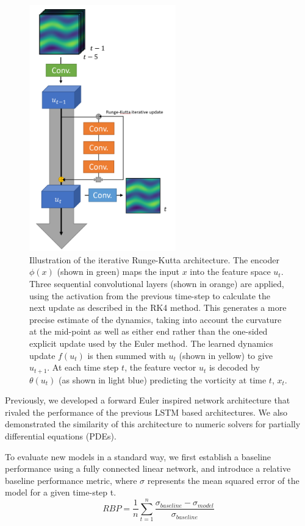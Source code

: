 \documentclass[12pt]{article}
\theoremstyle{plain}
\theoremstyle{remark}
\theoremstyle{definition}
\begin{document}
\begin{figure}

	\centering
	\includegraphics[width=2.5in]{pde_arch_rk4}
	\caption{Illustration of the iterative Runge-Kutta architecture. The encoder $\phi(x)$ (shown in green) maps the input $x$ into the feature space $u_t$. Three sequential convolutional layers (shown in orange) are applied, using the activation from the previous time-step to calculate the next update as described in the RK4 method. This generates a more precise estimate of the dynamics, taking into account the curvature at the mid-point as well as either end rather than the one-sided explicit update used by the  Euler method. The learned dynamics update $f(u_t)$ is then summed with $u_t$ (shown in yellow) to give $u_{t+1}$. At each time step $t$, the feature vector $u_t$ is decoded by $\theta(u_t)$ (as shown in light blue) predicting the vorticity at time $t$, $x_t$. }
	\label{fig:arch_rk4}

\end{figure}


Previously, we developed a forward Euler inspired network architecture that rivaled the performance of the previous LSTM based architectures. We also demonstrated the similarity of this architecture to numeric solvers for partially differential equations (PDEs).

To evaluate new models in a standard way, we first establish a baseline performance using a fully connected linear network, and introduce a relative baseline performance metric, where $\sigma$ represents the mean squared error of the model for a given time-step t.
$$RBP =  \frac{1}{n}\sum_{t=1}^{n}\frac{\sigma_{baseline} - \sigma_{model}}{ \sigma_{baseline}}$$ 
\end{document}
